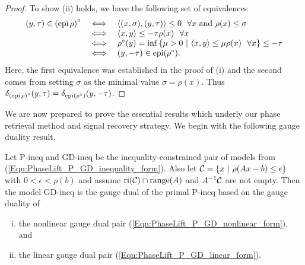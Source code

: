 \begin{proof}
To show (ii) holds, we have the following set of equivalences
\begin{equation*}
\begin{array}{rll}
(y, \tau) \in \left( \epi \halfspace \rho \right)^\circ
	&	\iff	&	 \langle (x, \sigma), (y, \tau) \rangle \leq 0 \ \ \forall x \text{ and } \rho(x) \leq \sigma
			\\
	&	\iff	&	\langle x, y \rangle \leq -\tau \rho(x) \ \ \forall x
			\\
	&	\iff	&	\rho^\circ(y) = \inf \left\{ \mu > 0 \ | \ \langle x, y \rangle \leq \mu \rho(x) \ \ \forall x \right\} \leq - \tau
			\\
		&	\iff	&	(y, -\tau)  \in \epi (\rho^\circ).
\end{array}
\end{equation*}
Here, the first equivalence was established in the proof of (i) and the second comes from setting $\sigma$ as the minimal value $\sigma = \rho(x)$.  Thus $\delta_{\left( \textnormal{epi} \hspace{0.05cm} \rho \right)^\circ} (y, \tau) = \delta_{\textnormal{epi} \left( \rho^\circ \right)}(y, -\tau)$.
\end{proof}






We are now prepared to prove the essential results which underly our phase retrieval method and signal recovery strategy.  We begin with the following gauge duality result.

\begin{theorem} 				\label{Thm:P-GD-inequality_pair_are_duals}
Let P-ineq and GD-ineq be the inequality-constrained pair of models from (\ref{Eqn:PhaseLift_P_GD_inequality_form}).  Also let ${\mathcal C} = \{ x \ | \ \rho(Ax-b) \leq \epsilon \}$ with $0 < \epsilon < \rho(b)$ and assume $\textnormal{ri}({\mathcal C}) \cap \textnormal{range}(A)$ and $A^{-1}{\mathcal C}$ are not empty.  Then the model GD-ineq is the gauge dual of the primal P-ineq based on the gauge duality of 
\begin{enumerate}[(i)]
\item
the nonlinear gauge dual pair (\ref{Eqn:PhaseLift_P_GD_nonlinear_form}), and
\item
the linear gauge dual pair (\ref{Eqn:PhaseLift_P_GD_linear_form}).
\end{enumerate}
\end{theorem}


